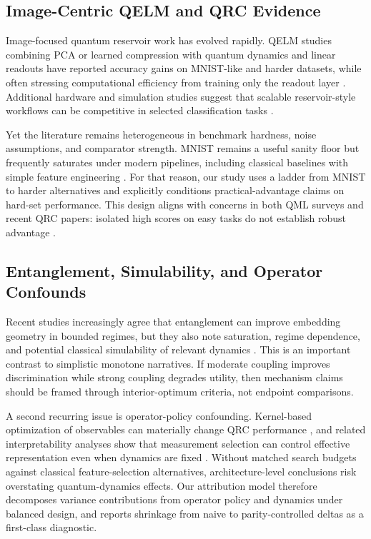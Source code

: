 \documentclass{article} %
\begin{document}
\subsection{Image-Centric QELM and QRC Evidence}
Image-focused quantum reservoir work has evolved rapidly. QELM studies combining PCA or learned compression with quantum dynamics and linear readouts have reported accuracy gains on MNIST-like and harder datasets, while often stressing computational efficiency from training only the readout layer \citep{delorenzis2024qelm,delorenzis2025entanglement}. Additional hardware and simulation studies suggest that scalable reservoir-style workflows can be competitive in selected classification tasks \citep{kornjaca2024largescale,prieto2026superconducting,antoncich2026neutral,liu2026rydberg,carles2025cqed,swierczewski2026optical,brusaschi2026inference,maier2025collider,assil2026memory}.

Yet the literature remains heterogeneous in benchmark hardness, noise assumptions, and comparator strength. MNIST remains a useful sanity floor but frequently saturates under modern pipelines, including classical baselines with simple feature engineering \citep{lecun1998mnist,xiao2017fashionmnist,cohen2017emnist}. For that reason, our study uses a ladder from MNIST to harder alternatives and explicitly conditions practical-advantage claims on hard-set performance. This design aligns with concerns in both QML surveys and recent QRC papers: isolated high scores on easy tasks do not establish robust advantage \citep{biamonte2017,delorenzis2025entanglement,gross2026paulitransfer}.

\subsection{Entanglement, Simulability, and Operator Confounds}
Recent studies increasingly agree that entanglement can improve embedding geometry in bounded regimes, but they also note saturation, regime dependence, and potential classical simulability of relevant dynamics \citep{delorenzis2025entanglement,askari2025spin,karimi2025kerr}. This is an important contrast to simplistic monotone narratives. If moderate coupling improves discrimination while strong coupling degrades utility, then mechanism claims should be framed through interior-optimum criteria, not endpoint comparisons.

A second recurring issue is operator-policy confounding. Kernel-based optimization of observables can materially change QRC performance \citep{gross2026kernelop,aaraba2026quark}, and related interpretability analyses show that measurement selection can control effective representation even when dynamics are fixed \citep{gross2026paulitransfer}. Without matched search budgets against classical feature-selection alternatives, architecture-level conclusions risk overstating quantum-dynamics effects. Our attribution model therefore decomposes variance contributions from operator policy and dynamics under balanced design, and reports shrinkage from naive to parity-controlled deltas as a first-class diagnostic.
\end{document}
